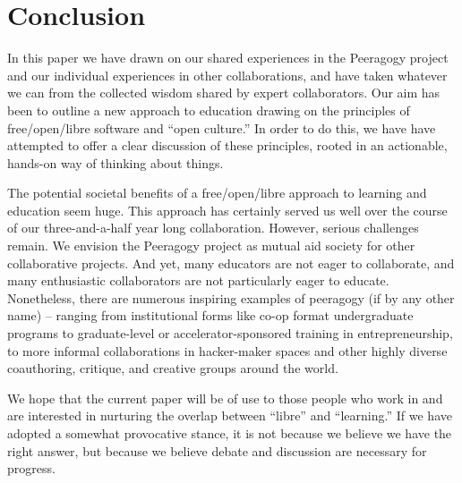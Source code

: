 \section{Conclusion}\label{sec:Conclusion}

In this paper we have drawn on our shared experiences in the Peeragogy
project and our individual experiences in other collaborations, and
have taken whatever we can from the collected wisdom shared by expert
collaborators.  Our aim has been to outline a new approach to
education drawing on the principles of free/open/libre software and
``open culture.''  In order to do this, we have have attempted to
offer a clear discussion of these principles, rooted in an actionable,
hands-on way of thinking about things.

The potential societal benefits of a free/open/libre approach to
learning and education seem huge.  This approach has certainly served
us well over the course of our three-and-a-half year long
collaboration.  However, serious challenges remain.  We envision the
Peeragogy project as mutual aid society for other collaborative
projects.  And yet, many educators are not eager to collaborate, and
many enthusiastic collaborators are not particularly eager to educate.
Nonetheless, there are numerous inspiring examples of peeragogy (if by
any other name) -- ranging from institutional forms like co-op format
undergraduate programs to graduate-level or accelerator-sponsored
training in entrepreneurship, to more informal collaborations in
hacker-maker spaces and other highly diverse coauthoring, critique,
and creative groups around the world.

We hope that the current paper will be of use to those people who work
in and are interested in nurturing the overlap between ``libre'' and
``learning.''  If we have adopted a somewhat provocative stance, it is
not because we believe we have the right answer, but because we
believe debate and discussion are necessary for progress.


